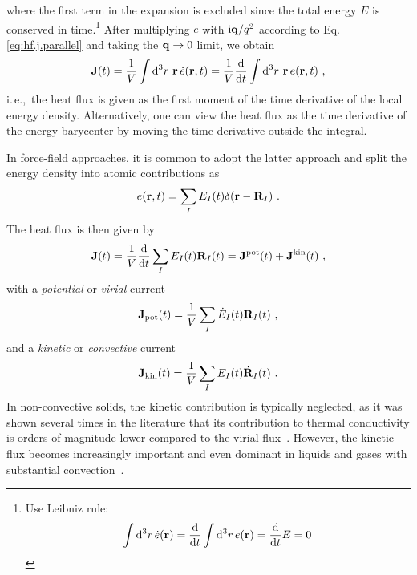 where the first term in the expansion is excluded since the total energy $E$ is conserved in time.\footnote{Use Leibniz rule:
\begin{align*}
	\int {\rm d}^3 r \, \dot{e} ({\bf r}) = \frac{{\rm d}}{{\rm d} t} \int {\rm d}^3 r \, e ({\bf r}) = \frac{{\rm d}}{{\rm d} t} E = 0
\end{align*}
}
After multiplying $\dot e$ with ${\rm i} {\bf q} / q^2$ according to Eq.\,\eqref{eq:hf.j.parallel} and taking the ${\bf q} \to 0$ limit, we obtain
\begin{align}
	\b J (t) 
		= \frac{1}{V} \int \d^3 r ~ \b r \, \dot{e} (\b r, t)
		= \frac{1}{V} \frac{\d}{\d t} \int \d^3 r ~ \b r \, e (\b r, t)
	~,
	\label{eq:hf.J}
\end{align}
i.\,e.,~the heat flux is given as the first moment of the time derivative of the local energy density. Alternatively, one can view the heat flux as the time derivative of the energy barycenter by moving the time derivative outside the integral.

In force-field approaches, it is common to adopt the latter approach and split the energy density into atomic contributions as
\begin{align}
	e (\b r, t ) = \sum_I E_I (t) \delta (\b r - \b R_I)~.
	\label{eq:hf.e.atomic}
\end{align}
The heat flux is then given by~\cite{Helfand1960}
\begin{align}
	\b J (t) 
		= \frac{1}{V} \frac{\d}{\d t} \sum_I E_I(t) \b R_I(t)
		= {\bf J}^{\rm pot} (t) + {\bf J}^{\rm kin} (t)~,
	\label{eq:hf.J.atomic}
\end{align}
with a \emph{potential} or \emph{virial} current
\begin{align}
	{\bf J}_{\rm pot} (t)
		= \frac{1}{V} \sum_I \dot{E}_I (t) \b R_I (t)~,
	\label{eq:J_pot}
\end{align}
and a \emph{kinetic} or \emph{convective} current
\begin{align}
	{\bf J}_{\rm kin} (t)
		= \frac{1}{V} \sum_I E_I (t) \dot{\b R}_I (t)~.
	\label{eq:J_kin}
\end{align}
In non-convective solids, the kinetic contribution is typically neglected, as it was shown several times in the literature that its contribution to thermal conductivity is orders of magnitude lower compared to the virial flux~\cite{Vogelsang1987,Kinaci2012}. However, the kinetic flux becomes increasingly important and even dominant in liquids and gases with substantial convection~\cite{Cheng2020}.

